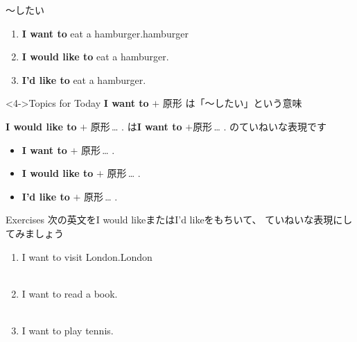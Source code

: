 \documentclass[aspectratio=169,xcolor={dvipsnames,table}]{beamer}
\begin{document}
\begin{frame}[plain]{～したい}
\large
 \begin{enumerate}
  \item<1-> \textbf{I want to} eat a hamburger.\hfill{\scriptsize hamburger }
  \item<2-> \textbf{I would like to} eat a hamburger.\hfill{\scriptsize {}}
  \item<3-> {\bfseries I'd like to} eat a hamburger.
 \end{enumerate}

\begin{block}<4->{Topics for Today}\small
\textbf{I want to} $+$ 原形\,\,は「～したい」という意味

\textbf{I would like to} $+$ 原形\,\ldots\,\,.\,\,は\textbf{I want to} $+$原形\,\ldots\,\,.\,\,のていねいな表現です
\begin{itemize}[square]\small
 \item \textbf{I want to} $+$ 原形\,\ldots\,\,.
 \item \textbf{I would like to} $+$ 原形\,\ldots\,\,.
 \item \textbf{I'd like to} $+$ 原形\,\ldots\,\,.
       \end{itemize}
\end{block}

\hfill{\scriptsize {}}

\end{frame}
\begin{frame}[plain]{Exercises}
次の英文をI would likeまたはI'd likeをもちいて、 ていねいな表現にしてみましょう
 \begin{enumerate}
  \item I want to visit London.\hfill{\scriptsize London }\\
\\
  \item I want to read a book.\\
\\
  \item I want to play tennis.\\
\\
 \end{enumerate}
\hfill{\scriptsize {}}

\end{frame}
\end{document}
